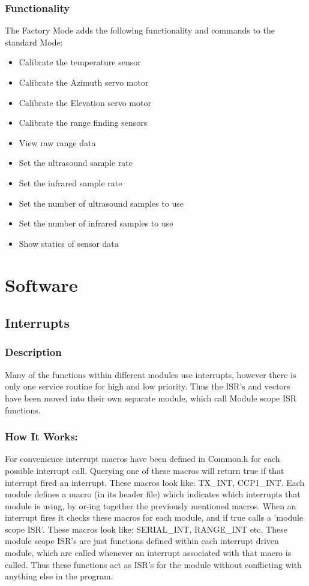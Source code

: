 \documentclass[]{report}
\begin{document}
\section{Functionality}
The Factory Mode adds the following functionality and commands to the standard Mode:
\begin{itemize}
	\item Calibrate the temperature sensor
	\item Calibrate the Azimuth servo motor
	\item Calibrate the Elevation servo motor
	\item Calibrate the range finding sensors
	\item View raw range data
	\item Set the ultrasound sample rate
	\item Set the infrared sample rate
	\item Set the number of ultrasound samples to use
	\item Set the number of infrared samples to use
	\item Show statics of sensor data
\end{itemize}


\part{Software}

\chapter{Interrupts}
\section{Description}
Many of the functions within different modules use interrupts, however there is only one service routine for high and low priority. Thus the ISR's and vectors have been moved into their own separate module, which call Module scope ISR functions.

\section{How It Works:}
For convenience interrupt macros have been defined in Common.h for each possible interrupt call. Querying one of these macros will return true if that interrupt fired an interrupt. These macros look like: TX\_INT, CCP1\_INT.\newline
Each module defines a macro (in its header file) which indicates which interrupts that module is using, by or-ing together the previously mentioned macros. When an interrupt fires it checks these macros for each module, and if true calls a 'module scope ISR'. These macros look like: SERIAL\_INT, RANGE\_INT etc. \newline
These module scope ISR's are just functions defined within each interrupt driven module, which are called whenever an interrupt associated with that macro is called. Thus these functions act as ISR's for the module without conflicting with anything else in the program.
\end{document}
